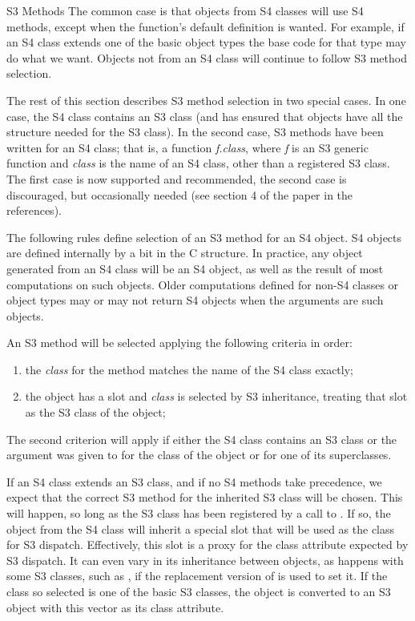 \begin{Section}{S3 Methods}
The common case is that objects from S4 classes will use S4 methods,
except when the function's default definition is wanted.  For example,
if an S4 class extends one of the basic object types the base code for
that type may do what we want.
Objects not from an S4 class will continue to follow S3 method selection.

The rest of this section describes S3 method selection in two special cases.
In one case, the S4 class contains an S3 class (and has ensured that
objects have all the structure needed for the S3 class).
In the second case, S3 methods have been written for an S4 class;
that is, a function \emph{f.class}, where \emph{f} is an S3 generic
function and \emph{class} is the name of an S4 class, other than a
registered S3 class.
The first case is now supported and recommended, the second case is
discouraged, but occasionally needed (see section 4 of the paper in
the references).

The following rules define selection of an S3 method for an S4
object.  S4 objects are defined internally by a bit in the C
structure.  In practice, any object generated from an S4 class will be
an S4 object, as well as the result of most computations
on such objects.  Older computations defined for non-S4 classes or
object types may or may not return S4 objects when the arguments are
such objects.

An S3 method will be selected applying the following criteria in order:
\begin{enumerate}


\item 
the \emph{class} for the method matches the name of the S4 class
exactly;


\item 
the object has a slot  and \emph{class} is selected
by S3 inheritance, treating that slot as the S3 class of the object;


\end{enumerate}

The second criterion will apply if either the S4 class contains an S3
class or the argument  was given to
 for the class of the object or for one of its
superclasses.


If an S4 class extends an S3 class, and if no S4 methods take precedence, we expect that the
correct S3 method for the inherited S3 class will be chosen.
This will happen, so long as the S3 class has been registered by a
call to .
If so, the object from the S4 class will inherit a special slot
that will be used as the class for S3 dispatch.  Effectively, this
slot is a proxy for the class attribute expected by S3 dispatch.  It
can even vary in its inheritance between objects, as happens with some
S3 classes, such as , if the replacement version
of  is used to set it.
If the class so selected is one of the basic S3 classes,
the object is converted to an S3 object
with this vector as its class attribute.


\end{Section}
